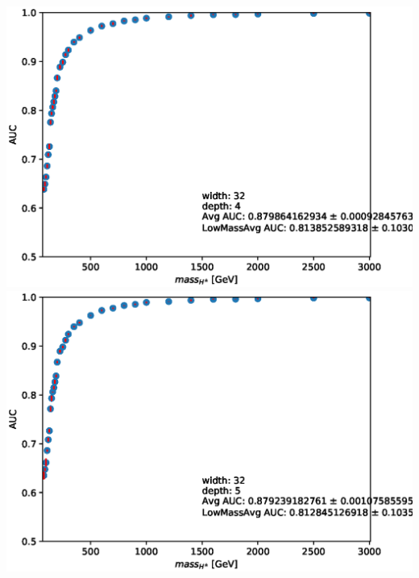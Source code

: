 \documentclass[aspectratio=169,xcolor=table]{beamer}
\begin{document}
\begin{frame}
\begin{columns}
      \includegraphics[height=.25\textheight,keepaspectratio=true]{AUC_Plots/model_GB_1024_channel_taulep_mass_80to3000_ntracks_1_nfolds_5_fold_4_nvars_19_batch_size_1024_epochs_1000_dense_layer_size_32_activation_function_LeakyRelu_depth_4_loss_binary_crossentropy_dropout_0.1_alpha_0.05.eps}
      \includegraphics[height=.25\textheight,keepaspectratio=true]{AUC_Plots/model_GB_1024_channel_taulep_mass_80to3000_ntracks_1_nfolds_5_fold_4_nvars_19_batch_size_1024_epochs_1000_dense_layer_size_32_activation_function_LeakyRelu_depth_5_loss_binary_crossentropy_dropout_0.1_alpha_0.05.eps}


\end{columns}
\end{frame}
\end{document}
